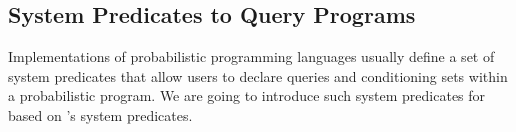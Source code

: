 \subsection{System Predicates to Query \dcproblogsty Programs}
\label{sec:system_query_predicates}

Implementations of probabilistic programming languages usually define a set of system predicates that allow users to declare queries and conditioning sets within a probabilistic program.
We are going to introduce such system predicates for \dcproblogsty based on \problogsty's system predicates.  









